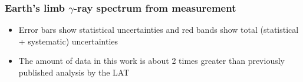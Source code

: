 \documentclass{beamer}
\begin{document}






\begin{frame}
\frametitle{Earth's limb $\gamma$-ray spectrum from measurement}


\begin{figure}[h!]
\end{figure}
\begin{itemize}
  \item Error bars show statistical uncertainties and red bands show total (statistical + systematic) uncertainties
  \item The amount of data in this work is about 2 times greater than previously published analysis by the LAT
\end{itemize}
\end{frame}
\end{document}
